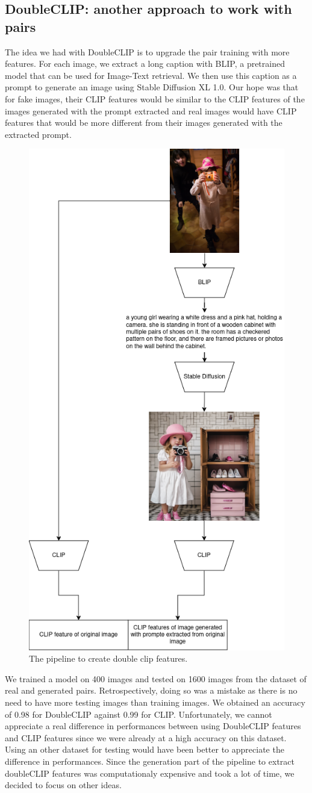 \documentclass[12pt,a4paper]{article}
\begin{document}
\subsection{DoubleCLIP: another approach to work with pairs}
The idea we had with DoubleCLIP is to upgrade the pair training with more features. For each image, we extract a long caption with BLIP, a pretrained model that can be used for Image-Text retrieval. We then use this caption as a prompt to generate an image using Stable Diffusion XL 1.0. Our hope was that for fake images, their CLIP features would be similar to the CLIP features of the images generated with the prompt extracted and real images would have CLIP features that would be more different from their images generated with the extracted prompt. 
\begin{figure}[H]
    \centering
    \includegraphics[width=.45\textwidth]{img/double_clip.png}
    \caption{The pipeline to create double clip features.}
\end{figure}
We trained a model on 400 images and tested on 1600 images from the dataset of real and generated pairs. Retrospectively, doing so was a mistake as there is no need to have more testing images than training images. We obtained an accuracy of 0.98 for DoubleCLIP against 0.99 for CLIP. Unfortunately, we cannot appreciate a real difference in performances between using DoubleCLIP features and CLIP features since we were already at a high accuracy on this dataset. Using an other dataset for testing would have been better to appreciate the difference in performances. Since the generation part of the pipeline to extract doubleCLIP features was computationaly expensive and took a lot of time, we decided to focus on other ideas.
\end{document}
